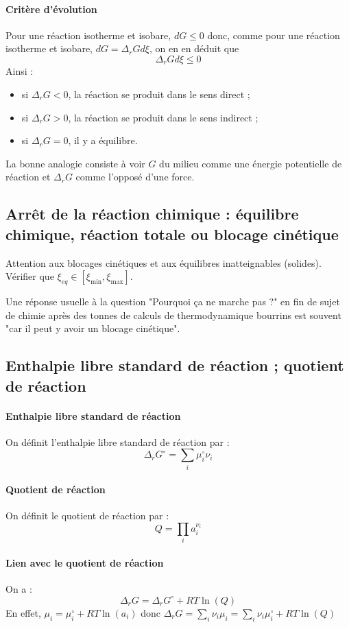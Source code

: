\documentclass[french]{book}
\theoremstyle{plain}
\theoremstyle{definition}
\theoremstyle{remark}
\begin{document}
\paragraph{Critère d'évolution} Pour une réaction isotherme et isobare, $dG\leqslant0$ donc, comme pour une réaction isotherme et isobare, $dG=\Delta_rGd\xi$, on en en déduit que $$\Delta_rGd\xi\leqslant0$$ Ainsi : \begin{itemize}
	\item si $\Delta_rG<0$, la réaction se produit dans le sens direct ;
	\item si $\Delta_rG>0$, la réaction se produit dans le sens indirect ;
	\item si $\Delta_rG=0$, il y a équilibre.
\end{itemize}
La bonne analogie consiste à voir $G$ du milieu comme une énergie potentielle de réaction et $\Delta_rG$ comme l'opposé d'une force.
\subsection{Arrêt de la réaction chimique : équilibre chimique, réaction totale ou blocage cinétique}
Attention aux blocages cinétiques et aux équilibres inatteignables (solides). Vérifier que $\xi_{eq}\in\left[\xi_\text{min},\xi_\text{max}\right]$. \\ \par Une réponse usuelle à la question "Pourquoi ça ne marche pas ?" en fin de sujet de chimie après des tonnes de calculs de thermodynamique bourrins est souvent "car il peut y avoir un blocage cinétique".
\subsection{Enthalpie libre standard de réaction ; quotient de réaction}
\paragraph{Enthalpie libre standard de réaction} On définit l'enthalpie libre standard de réaction par : $$\Delta_rG^\circ=\sum_i\mu_i^\circ\nu_i$$
\paragraph{Quotient de réaction} On définit le quotient de réaction par : $$Q=\prod_i a_i^{\nu_i}$$
\paragraph{Lien avec le quotient de réaction} On a : $$\Delta_rG=\Delta_rG^\circ+RT\ln(Q)$$ En effet, $\mu_i=\mu_i^\circ+RT\ln(a_i)$ donc $\Delta_rG=\displaystyle\sum_i\nu_i\mu_i=\sum_i\nu_i\mu_i^\circ+RT\ln(Q)$
\end{document}
